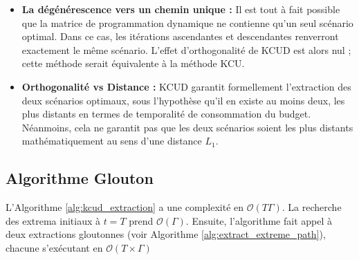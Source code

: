 \documentclass[11pt,a4paper]{article}
\begin{document}
\begin{itemize}
    \item \textbf{La dégénérescence vers un chemin unique :} Il est tout à fait possible que la matrice de programmation dynamique ne contienne qu'un seul scénario optimal. Dans ce cas, les itérations ascendantes et descendantes renverront exactement le même scénario. L'effet d'orthogonalité de KCUD est alors nul ; cette méthode serait équivalente à la méthode KCU.
    \item \textbf{Orthogonalité vs Distance :} KCUD garantit formellement l'extraction des deux scénarios optimaux, sous l'hypothèse qu'il en existe au moins deux, les plus distants en termes de temporalité de consommation du budget. Néanmoins, cela ne garantit pas que les deux scénarios soient les plus distants mathématiquement au sens d'une distance $L_1$.
\end{itemize}

\subsection{Algorithme Glouton}

L'Algorithme \ref{alg:kcud_extraction} a une complexité en $\mathcal{O}(T\Gamma)$. La recherche des extrema initiaux à $t=T$ prend $\mathcal{O}(\Gamma)$. Ensuite, l'algorithme fait appel à deux extractions gloutonnes (voir Algorithme \ref{alg:extract_extreme_path}), chacune s'exécutant en $\mathcal{O}(T \times \Gamma)$
\end{document}

